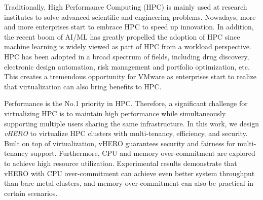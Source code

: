 Traditionally, High Performance Computing (HPC) is mainly used at research institutes to solve advanced scientific and engineering problems. Nowadays, more and more enterprises start to embrace HPC to speed up innovation. In addition, the recent boom of AI/ML has greatly propelled the adoption of HPC since machine learning is widely viewed as part of HPC from a workload perspective. HPC has been adopted in a broad spectrum of fields, including drug discovery, electronic design automation, risk management and portfolio optimization, etc. This creates a tremendous opportunity for VMware as enterprises start to realize that virtualization can also bring benefits to HPC. 

Performance is the No.1 priority in HPC. Therefore, a significant challenge for virtualizing HPC is to maintain high performance while simultaneously supporting multiple users sharing the same infrastructure.
In this work, 
we design \textit{vHERO} to virtualize HPC clusters with multi-tenancy, efficiency, and security. 
Built on top of virtualization, vHERO guarantees security and fairness for multi-tenancy support. Furthermore, CPU and memory over-commitment are explored to achieve high resource utilization. 
Experimental results demonstrate that vHERO with CPU over-commitment can achieve even better system throughput than bare-metal clusters, and memory over-commitment can also be practical in certain scenarios. 
